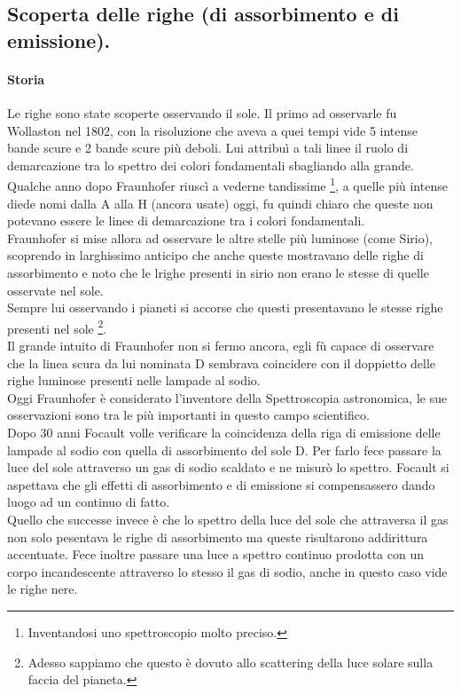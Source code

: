 \subsection{Scoperta delle righe (di assorbimento e di emissione).}%
\paragraph{Storia}
Le righe sono state scoperte osservando il sole. Il primo ad osservarle fu Wollaston nel 1802, con la risoluzione che aveva a quei tempi vide 5 intense bande scure e 2 bande scure più deboli. Lui attribuì a tali linee il ruolo di demarcazione tra lo spettro dei colori fondamentali sbagliando alla grande. \\
Qualche anno dopo Fraunhofer riuscì a vederne tandissime \footnote{Inventandosi uno spettroscopio molto preciso.}, a quelle più intense diede nomi dalla A alla H (ancora usate) oggi, fu quindi chiaro che queste non potevano essere le linee di demarcazione tra i colori fondamentali.\\
Fraunhofer si mise allora ad osservare le altre stelle più luminose (come Sirio), scoprendo in larghissimo anticipo che anche queste mostravano delle righe di assorbimento e noto che le lrighe presenti in sirio non erano le stesse di quelle osservate nel sole. \\
Sempre lui osservando i pianeti si accorse che questi presentavano le stesse righe presenti nel sole \footnote{Adesso sappiamo che questo è dovuto allo scattering della luce solare sulla faccia del pianeta.}. \\
Il grande intuito di Fraunhofer non si fermo ancora, egli fù capace di osservare che la linea scura da lui nominata D sembrava coincidere con il doppietto delle righe luminose presenti nelle lampade al sodio.\\
Oggi Fraunhofer è considerato l'inventore della Spettroscopia astronomica, le sue osservazioni sono tra le più importanti in questo campo scientifico.\\
Dopo 30 anni Focault volle verificare la coincidenza della riga di emissione delle lampade al sodio con quella di assorbimento del sole D. Per farlo fece passare la luce del sole attraverso un gas di sodio scaldato e ne misurò lo spettro. Focault si aspettava che gli effetti di assorbimento e di emissione si compensassero dando luogo ad un continuo di fatto. \\
Quello che successe invece è che lo spettro della luce del sole che attraversa il gas non solo pesentava le righe di assorbimento ma queste risultarono addirittura accentuate. Fece inoltre passare una luce a spettro continuo prodotta con un corpo incandescente attraverso lo stesso il gas di sodio, anche in questo caso vide le righe nere.\\
